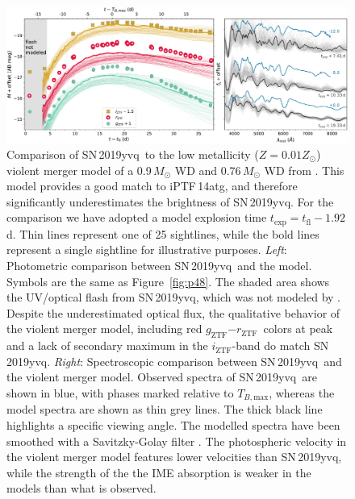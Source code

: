 \documentclass[twocolumn]{aastex63}
\newcommand{\rztf}{$r_\mathrm{ZTF}$}
\newcommand{\gztf}{$g_\mathrm{ZTF}$}
\newcommand{\iztf}{$i_\mathrm{ZTF}$}
\newcommand{\tbmax}{$T_{B,\mathrm{max}}$}
\newcommand{\sn}{SN\,2019yvq}
\begin{document}
\begin{figure}
    \centering
    \includegraphics[width=\textwidth]{./figures/violent_merger.pdf}
    \caption{Comparison of \sn\ to the low metallicity ($Z = 0.01 Z_\odot$)
    violent merger model of a 0.9\,$M_\odot$ WD and 0.76\,$M_\odot$ WD from
    \citet{Kromer16}. This model provides a good match to iPTF\,14atg, and
    therefore significantly underestimates the brightness of \sn. For the
    comparison we have adopted a model explosion time $t_\mathrm{exp} =
    t_\mathrm{fl} - 1.92$\,d. Thin lines represent one of 25 sightlines, while
    the bold lines represent a single sightline for illustrative purposes.
    \textit{Left}: Photometric comparison between \sn\ and the model. Symbols
    are the same as Figure~\ref{fig:p48}. The shaded area shows the UV/optical
    flash from \sn, which was not modeled by \citet{Kromer16}. Despite the
    underestimated optical flux, the qualitative behavior of the violent
    merger model, including red \gztf$ - $\rztf\ colors at peak and a lack of
    secondary maximum in the \iztf-band do match \sn. \textit{Right}:
    Spectroscopic comparison between \sn\ and the violent merger model.
    Observed spectra of \sn\ are shown in blue, with phases marked relative to
    \tbmax, whereas the model spectra are shown as thin grey lines. The thick
    black line highlights a specific viewing angle. The modelled spectra have
    been smoothed with a Savitzky-Golay filter \citep{Savitzky64}. The
    photospheric velocity in the violent merger model features lower
    velocities than \sn, while the strength of the the IME absorption is
    weaker in the models than what is observed.}
    \label{fig:violent_merger}
\end{figure}
\end{document}
